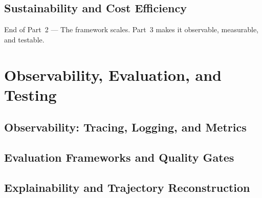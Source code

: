 \documentclass[
  11pt,
  twoside,
  openright
]{book}
\makeatletter
\renewcommand{\cleardoublepage}{%
  \clearpage
  \if@twoside
    \ifodd\c@page
    \else
      \thispagestyle{empty}%
      \hbox{}%
      \newpage
      \if@twocolumn\hbox{}\newpage\fi
    \fi
  \fi
}
\newcommand{\partclose}[1]{%
  \cleardoublepage
  \vspace*{\fill}
  \begin{center}
    \sffamily\Large\color{BookBlue}#1
  \end{center}
  \vspace*{\fill}
  \cleardoublepage
}
\makeatother
\begin{document}
\chapter{Sustainability and Cost Efficiency}
\label{ch:sustainability}

\partclose{End of Part~2 --- The framework scales.
Part~3 makes it observable, measurable, and testable.}

\part{Observability, Evaluation, and Testing}
\label{part:observability}

\chapter{Observability: Tracing, Logging, and Metrics}
\label{ch:observability}

\chapter{Evaluation Frameworks and Quality Gates}
\label{ch:evaluation}

\chapter{Explainability and Trajectory Reconstruction}
\label{ch:explainability}
\end{document}
